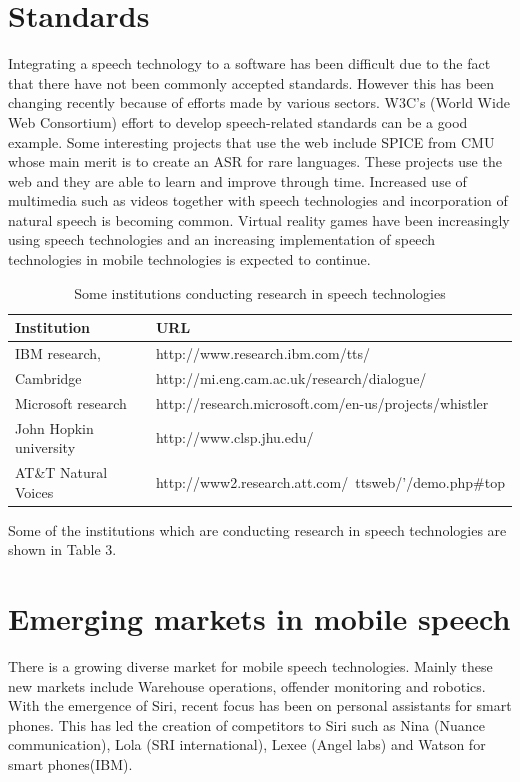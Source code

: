 \documentclass[11pt,a4paper,oneside,article]{memoir}
\begin{document}
\section{Standards}
Integrating a speech technology to a software has been difficult due to the fact that there have not been commonly accepted standards. However this has been changing recently because of efforts made by various sectors. W3C's (World Wide Web Consortium) effort to develop speech-related standards can be a good example. Some interesting projects that use the web include SPICE from CMU whose main merit is to create an ASR for rare languages. These projects use the web and they are able to learn and improve through time. Increased use of multimedia such as videos together with speech technologies and incorporation of natural speech is becoming common. Virtual reality games have been increasingly using speech technologies and an increasing implementation of speech technologies in mobile technologies is expected to continue. \cite{rob}

\begin{table}[h]
 \caption{Some institutions conducting research in speech technologies}
    \begin{tabular}{ | l | l | }
    \hline
    \textbf{Institution} & \textbf{URL} \\ \hline
    IBM research, & http://www.research.ibm.com/tts/ \\ \hline
    Cambridge &  http://mi.eng.cam.ac.uk/research/dialogue/   \\ \hline
    Microsoft research &  http://research.microsoft.com/en-us/projects/whistler \\ \hline
    John Hopkin university &  http://www.clsp.jhu.edu/   \\ \hline
    AT\&T Natural Voices & http://www2.research.att.com/~ttsweb/'/demo.php\#top  \\ \hline
    \end{tabular}
\end{table}

Some of the institutions which are conducting research in speech technologies are shown in Table 3.

\section{Emerging markets in mobile speech}
There is a growing diverse market for mobile speech technologies. Mainly these new markets include Warehouse operations, offender monitoring and robotics. With the emergence of Siri, recent focus has been on personal assistants for smart phones. This has led the creation of competitors to Siri such as Nina (Nuance communication), Lola (SRI international), Lexee (Angel labs) and Watson for smart phones(IBM). \cite{markowitz}
\end{document}
